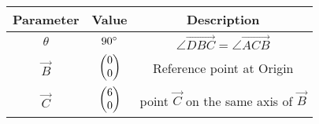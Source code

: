 \begin{tabular}{|c|c|c|}
\hline
\textbf{Parameter} & \textbf{Value} & \textbf{Description} \\
\hline
	$\theta$ & $90\degree$ & $\angle{\vec{DBC}} = \angle{\vec{ACB}}$ \\
\hline
	$\vec{B}$ & $\begin{pmatrix}0\\0\end{pmatrix}$ & Reference point at Origin \\
\hline
	$\vec{C}$ & $\begin{pmatrix}6\\0\end{pmatrix}$ & point $\vec{C}$ on the same axis of $\vec{B}$ \\
\hline
\end{tabular}
